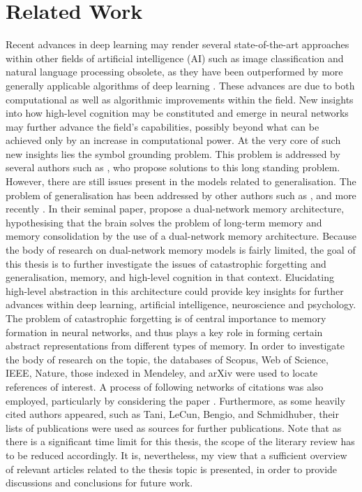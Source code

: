 
\chapter{Related Work}

Recent advances in deep learning may render several state-of-the-art approaches within other fields of artificial intelligence (AI) such as image classification and natural language processing obsolete, as they have been outperformed by more generally applicable algorithms of deep learning \citep{LeCun2015, Schmidhuber2014}. These advances are due to both computational as well as algorithmic improvements within the field. New insights into how high-level cognition may be constituted and emerge in neural networks may further advance the field's capabilities, possibly beyond what can be achieved only by an increase in computational power. At the very core of such new insights lies the symbol grounding problem. This problem is addressed by several authors such as \cite{Yamashita2008, Tani2014}, who propose solutions to this long standing problem. However, there are still issues present in the models related to generalisation. The problem of generalisation has been addressed by other authors such as \cite{McClelland1995}, and more recently \cite{Hattori2014}. In their seminal paper, \cite{McClelland1995} propose a dual-network memory architecture, hypothesising that the brain solves the problem of long-term memory and memory consolidation by the use of a dual-network memory architecture. Because the body of research on dual-network memory models is fairly limited, the goal of this thesis is to further investigate the issues of catastrophic forgetting and generalisation, memory, and high-level cognition in that context. Elucidating high-level abstraction in this architecture could provide key insights for further advances within deep learning, artificial intelligence, neuroscience and psychology. The problem of catastrophic forgetting is of central importance to memory formation in neural networks, and thus plays a key role in forming certain abstract representations from different types of memory.
In order to investigate the body of research on the topic, the databases of Scopus, Web of Science, IEEE, Nature, those indexed in Mendeley, and arXiv were used to locate references of interest. A process of following networks of citations was also employed, particularly by considering the paper \citep{McClelland1995}. Furthermore, as some heavily cited authors appeared, such as Tani, LeCun, Bengio, and Schmidhuber, their lists of publications were used as sources for further publications. Note that as there is a significant time limit for this thesis, the scope of the literary review has to be reduced accordingly. It is, nevertheless, my view that a sufficient overview of relevant articles related to the thesis topic is presented, in order to provide discussions and conclusions for future work.

